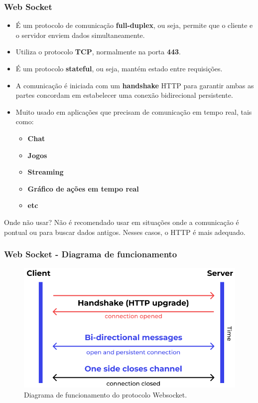 \documentclass[
	10pt, %
	t, %
]{beamer}
\begin{document}
\begin{frame}
	\frametitle{Web Socket}

	\begin{itemize}
		\item É um protocolo de comunicação \textbf{full-duplex}, ou seja, permite que o cliente e o servidor enviem dados simultaneamente.
		\item Utiliza o protocolo \textbf{TCP}, normalmente na porta \textbf{443}.
		\item É um protocolo \textbf{stateful}, ou seja, mantém estado entre requisições.
		\item A comunicação é iniciada com um \textbf{handshake} HTTP para garantir ambas as partes concordam em estabelecer uma conexão bidirecional persistente.
		\item Muito usado em aplicações que precisam de comunicação em tempo real, tais como: 
		\begin{itemize}
			\item \textbf{Chat}
			\item \textbf{Jogos}
			\item \textbf{Streaming}
			\item \textbf{Gráfico de ações em tempo real}
			\item \textbf{etc}
		\end{itemize}
	\end{itemize}

	\begin{alertblock}{Onde não usar?}
		Não é recomendado usar em situações onde a comunicação é pontual ou para buscar dados antigos. Nesses casos, o HTTP é mais adequado.
	\end{alertblock}


\end{frame}

\begin{frame}
	\frametitle{Web Socket - Diagrama de funcionamento}

	\begin{figure}
		\centering
		\includegraphics[width=0.9\linewidth]{websocket.png}
		\caption{Diagrama de funcionamento do protocolo Websocket.}
		\label{fig:websocket}
	\end{figure}

\end{frame}
\end{document}
